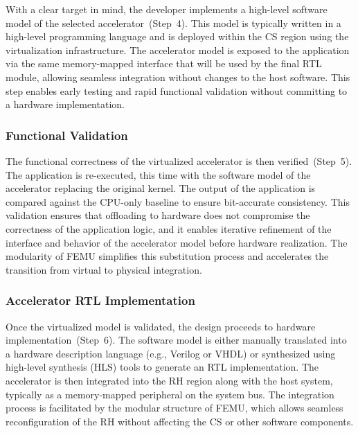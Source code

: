                 With a clear target in mind, the developer implements a high-level software model of the selected accelerator~(Step~4). This model is typically written in a high-level programming language and is deployed within the CS region using the virtualization infrastructure. The accelerator model is exposed to the application via the same memory-mapped interface that will be used by the final RTL module, allowing seamless integration without changes to the host software. This step enables early testing and rapid functional validation without committing to a hardware implementation.
            
            \subsubsection*{Functional Validation}
            
                The functional correctness of the virtualized accelerator is then verified~(Step~5). The application is re-executed, this time with the software model of the accelerator replacing the original kernel. The output of the application is compared against the CPU-only baseline to ensure bit-accurate consistency. This validation ensures that offloading to hardware does not compromise the correctness of the application logic, and it enables iterative refinement of the interface and behavior of the accelerator model before hardware realization. The modularity of FEMU simplifies this substitution process and accelerates the transition from virtual to physical integration.
            
            \subsubsection*{Accelerator RTL Implementation}
            
                Once the virtualized model is validated, the design proceeds to hardware implementation~(Step~6). The software model is either manually translated into a hardware description language (e.g., Verilog or VHDL) or synthesized using high-level synthesis (HLS) tools to generate an RTL implementation. The accelerator is then integrated into the RH region along with the host system, typically as a memory-mapped peripheral on the system bus. The integration process is facilitated by the modular structure of \mbox{FEMU}, which allows seamless reconfiguration of the RH without affecting the CS or other software components.
            
